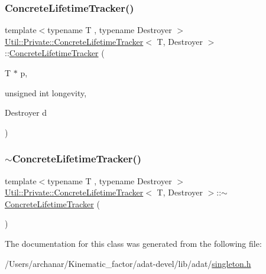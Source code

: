 \mbox{\label{classUtil_1_1Private_1_1ConcreteLifetimeTracker_a57e26a2e72542caf98f691f0972718d1}} 
\subsubsection{\texorpdfstring{ConcreteLifetimeTracker()}{ConcreteLifetimeTracker()}\hspace{0.1cm}{\footnotesize\ttfamily [3/3]}}
{\footnotesize\ttfamily template$<$typename T , typename Destroyer $>$ \\
\mbox{\hyperlink{classUtil_1_1Private_1_1ConcreteLifetimeTracker}{Util\+::\+Private\+::\+Concrete\+Lifetime\+Tracker}}$<$ T, Destroyer $>$\+::\mbox{\hyperlink{classUtil_1_1Private_1_1ConcreteLifetimeTracker}{Concrete\+Lifetime\+Tracker}} (\begin{DoxyParamCaption}\item[{T $\ast$}]{p,  }\item[{unsigned int}]{longevity,  }\item[{Destroyer}]{d }\end{DoxyParamCaption})\hspace{0.3cm}{\ttfamily [inline]}}

\mbox{\label{classUtil_1_1Private_1_1ConcreteLifetimeTracker_a46aa326f024ef9d7301b84af803c5fb0}} 
\subsubsection{\texorpdfstring{$\sim$ConcreteLifetimeTracker()}{~ConcreteLifetimeTracker()}\hspace{0.1cm}{\footnotesize\ttfamily [3/3]}}
{\footnotesize\ttfamily template$<$typename T , typename Destroyer $>$ \\
\mbox{\hyperlink{classUtil_1_1Private_1_1ConcreteLifetimeTracker}{Util\+::\+Private\+::\+Concrete\+Lifetime\+Tracker}}$<$ T, Destroyer $>$\+::$\sim$\mbox{\hyperlink{classUtil_1_1Private_1_1ConcreteLifetimeTracker}{Concrete\+Lifetime\+Tracker}} (\begin{DoxyParamCaption}{ }\end{DoxyParamCaption})\hspace{0.3cm}{\ttfamily [inline]}}



The documentation for this class was generated from the following file\+:\begin{DoxyCompactItemize}
\item 
/\+Users/archanar/\+Kinematic\+\_\+factor/adat-\/devel/lib/adat/\mbox{\hyperlink{adat-devel_2lib_2adat_2singleton_8h}{singleton.\+h}}\end{DoxyCompactItemize}
